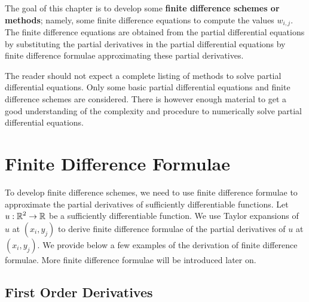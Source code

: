 The goal of this chapter is to develop some
{\bfseries finite difference schemes or methods};
namely, some finite difference equations to compute the values
$w_{i,j}$.   The finite difference equations are obtained from the
partial differential equations by substituting the partial derivatives
in the partial differential equations by finite difference formulae
approximating these partial derivatives.

The reader should not expect a complete listing of methods to solve
partial differential equations.  Only some basic partial differential
equations and finite difference schemes are considered.  There is
however enough material to get a good understanding of the complexity
and procedure to numerically solve partial differential equations.

\section{Finite Difference Formulae}\label{Basicfdf}

To develop finite difference schemes, we need to use finite difference
formulae to approximate the partial derivatives of sufficiently
differentiable functions.  Let $\displaystyle u:\mathbb{R}^2 \to \mathbb{R}$ be a sufficiently
differentiable function.  We use Taylor expansions of $u$ 
at $(x_i,y_j)$ to derive finite difference formulae of the
partial derivatives of $u$ at $(x_i,y_j)$.  We provide below a few
examples of the derivation of finite difference formulae.  More
finite difference formulae will be introduced later on.

\subsection{First Order Derivatives}

